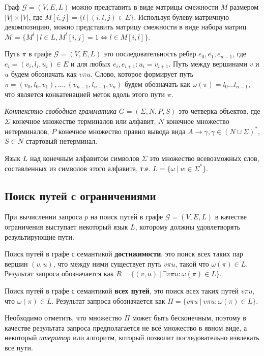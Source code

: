 \documentclass[14pt]{matmex-diploma-custom}
\begin{document}
Граф $\mathcal{G} = (V, E, L)$ можно представить в виде матрицы смежности $M$ размером $|V| \times |V|$, где $M[i,j] = \{l~|~(i,l,j) \in E\}$. Используя булеву матричную декомпозицию, можно представить матрицу смежности в виде набора матриц $\mathcal{M} = \{ M^l ~|~ l \in L, M^l[i,j] = 1 \iff l \in M[i,l]\}$.

Путь $\pi$ в графе $\mathcal{G} = (V, E, L)$ это последовательность ребер $e_0,e_1,e_{n-1}$, где $e_i = (v_i, l_i, u_i) \in E$ и для любых $e_i, e_{i+1}: u_i = v_{i+1}$. Путь между вершинами $v$ и $u$ будем обозначать как $v \pi u$. Слово, которое формирует путь $\pi = (v_0, l_0, v_1), ... ,(v_{n-1}, l_{n-1}, v_n)$ будем обозначать как $\omega (\pi) = l_0 ... l_{n-1}$, что является конкатенацией меток вдоль этого пути $\pi$.

\textit{Контекстно-свободная грамматика} $G = (\Sigma, N, P, S)$ это четверка объектов, где $\Sigma$ конечное множестве терминалов или алфавит, $N$ конечное множество нетерминалов, $P$ конечное множество правил вывода вида $A \rightarrow \gamma, \gamma \in (N \cup \Sigma)^*$, $S \in N$ стартовый нетерминал. 

Язык $L$ над конечным алфавитом символов $\Sigma$ это множество всевозможных слов, составленных из символов этого алфавита, т.е. $L = \{\omega~|~w \in \Sigma ^*\}$.

\subsection{Поиск путей с ограничениями}

При вычислении запроса $p$ на поиск путей в графе $\mathcal{G} = (V, E, L)$ в качестве ограничения выступает некоторый язык $L$, которому должны удовлетворять результирующие пути.

Поиск путей в графе с семантикой \textbf{достижимости}, это поиск всех таких пар вершин $(v,u)$, что между ними существует путь $v \pi u$, такой что $\omega (\pi) \in L$. Результат запроса обозначается как $R = \{ (v,u)~|~\exists v \pi u : \omega (\pi) \in L \}$.

Поиск путей в графе с семантикой \textbf{всех путей}, это поиск всех таких путей $v \pi u$,   что $\omega (\pi) \in L$. Результат запроса обозначается как $\Pi = \{ v \pi u~|~v \pi u : \omega (\pi) \in L \}$.

Необходимо отметить, что множество $\Pi$ может быть бесконечным, поэтому в качестве результата запроса предполагается не всё множество в явном виде, а некоторый \textit{итератор} или алгоритм, который позволит последовательно извлекать все пути.
\end{document}
